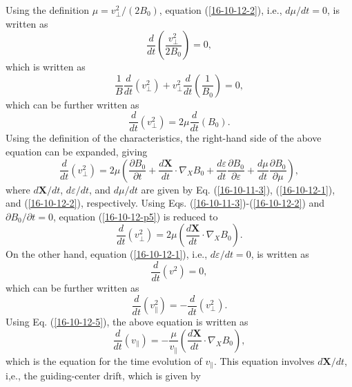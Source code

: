 \documentclass{llncs}
\begin{document}
Using the definition $\mu = v_{\perp}^2 / (2 B_0)$, equation
(\ref{16-10-12-2}), i.e., $d \mu / d t = 0$, is written as
\begin{equation}
  \frac{d}{d t} \left( \frac{v_{\perp}^2}{2 B_0} \right) = 0,
\end{equation}
which is written as
\begin{equation}
  \frac{1}{B}  \frac{d}{d t} (v_{\perp}^2) + v_{\perp}^2  \frac{d}{d t}
  (\frac{1}{B_0}) = 0,
\end{equation}
which can be further written as
\begin{equation}
  \frac{d}{d t} (v_{\perp}^2) = 2 \mu \frac{d}{d t} (B_0) .
\end{equation}
Using the definition of the characteristics, the right-hand side of the above
equation can be expanded, giving
\begin{equation}
  \label{16-10-12-p5} \frac{d}{d t} (v_{\perp}^2) = 2 \mu \left(
  \frac{\partial B_0}{\partial t} + \frac{d\mathbf{X}}{d t} \cdot \nabla_X B_0
  + \frac{d \varepsilon}{d t}  \frac{\partial B_0}{\partial \varepsilon} +
  \frac{d \mu}{d t}  \frac{\partial B_0}{\partial \mu} \right),
\end{equation}
where $d\mathbf{X}/ d t$, $d \varepsilon / d t$, and $d \mu / d t$ are given
by Eq. (\ref{16-10-11-3}), (\ref{16-10-12-1}), and (\ref{16-10-12-2}),
respectively. Using Eqs. (\ref{16-10-11-3})-(\ref{16-10-12-2}) and $\partial
B_0 / \partial t = 0$, equation (\ref{16-10-12-p5}) is reduced to
\begin{equation}
  \label{16-10-12-5} \frac{d}{d t} (v_{\perp}^2) = 2 \mu \left(
  \frac{d\mathbf{X}}{d t} \cdot \nabla_X B_0 \right) .
\end{equation}
On the other hand, equation (\ref{16-10-12-1}), i.e., $d \varepsilon / d t =
0$, is written as
\begin{equation}
  \frac{d}{d t} (v^2) = 0,
\end{equation}
which can be further written as
\begin{equation}
  \frac{d}{d t} (v^2_{\parallel}) = - \frac{d}{d t} (v^2_{\perp}) .
\end{equation}
Using Eq. (\ref{16-10-12-5}), the above equation is written as
\begin{equation}
  \label{16-10-12-p1} \frac{d}{d t} (v_{\parallel}) = -
  \frac{\mu}{v_{\parallel}} \left( \frac{d\mathbf{X}}{d t} \cdot \nabla_X B_0
  \right),
\end{equation}
which is the equation for the time evolution of $v_{\parallel}$. This equation
involves $d\mathbf{X}/ d t$, i,e., the guiding-center drift, which is given by
\end{document}
